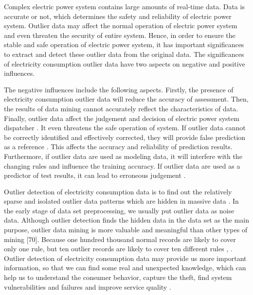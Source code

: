 Complex electric power system contains large amounts of real-time data. Data is accurate or not, which determines the safety and reliability of electric power system. Outlier data may affect the normal operation of electric power system and even threaten the security of entire system. Hence, in order to ensure the stable and safe operation of electric power system, it has important significances to extract and detect these outlier data from the original data. The significances of electricity consumption outlier data have two aspects on negative and positive influences.

The negative influences include the following aspects. Firstly, the presence of electricity consumption outlier data will reduce the accuracy of assessment. Then, the results of data mining cannot accurately reflect the characteristics of data. Finally, outlier data affect the judgement and decision of electric power system dispatcher \cite{huang2004enhancement}. It even threatens the safe operation of system. If outlier data cannot be correctly identified and effectively corrected, they will provide false prediction as a reference \cite{pham2014anomaly}. This affects the accuracy and reliability of prediction results. Furthermore, if outlier data are used as modeling data, it will interfere with the changing rules and influence the training accuracy. If outlier data are used as a predictor of test results, it can lead to erroneous judgement \cite{mao2005principle}.

Outlier detection of electricity consumption data is to find out the relatively sparse and isolated outlier data patterns which are hidden in massive data \cite{chen2016data}. In the early stage of data set preprocessing, we usually put outlier data as noise data. Although outlier detection finds the hidden data in the data set as the main purpose, outlier data mining is more valuable and meaningful than other types of mining [70]. Because one hundred thousand normal records are likely to cover only one rule, but ten outlier records are likely to cover ten different rules \cite{mao2005principle}, \cite{chen2016data}. Outlier detection of electricity consumption data may provide us more important information, so that we can find some real and unexpected knowledge, which can help us to understand the consumer behavior, capture the theft, find system vulnerabilities and failures and improve service quality \cite{pham2014anomaly} .

